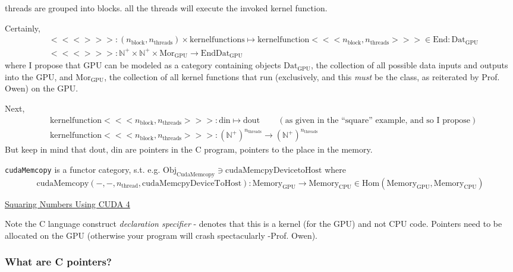 \documentclass[10pt]{amsart}
\begin{document}
\begin{multicols*}{2}
threads are grouped into blocks.  all the threads will execute the invoked kernel function.

Certainly,
\[
\begin{aligned}
  & <<<>>>:(n_{\text{block}}, n_{\text{threads}})\times \text{kernelfunctions} \mapsto \text{kernelfunction}<<<n_{\text{block}},n_{\text{threads}}>>> \in \text{End}:\text{Dat}_{\text{GPU}} \\ 
  & <<<>>>: \mathbb{N}^+ \times \mathbb{N}^+ \times \text{Mor}_{\text{GPU}} \to \text{End}\text{Dat}_{\text{GPU}}
  \end{aligned}
\]
where I propose that GPU can be modeled as a category containing objects $\text{Dat}_{\text{GPU}}$, the collection of all possible data inputs and outputs into the GPU, and $\text{Mor}_{\text{GPU}}$, the collection of all kernel functions that run (exclusively, and this \emph{must} be the class, as reiterated by Prof. Owen) on the GPU.

Next,
\[
\begin{aligned}
  & \text{kernelfunction}<<<n_{\text{block}},n_{\text{threads}}>>>: \text{din}\mapsto \text{dout} \qquad \, (\text{as given in the ``square'' example, and so I propose}) \\ 
  & \text{kernelfunction}<<<n_{\text{block}},n_{\text{threads}}>>>:(\mathbb{N}^+)^{n_{\text{threads}}} \to (\mathbb{N}^+)^{n_{\text{threads}}}
  \end{aligned}
\]
But keep in mind that $\text{dout}$, $\text{din}$ are pointers in the C program, pointers to the place in the memory.  

\verb|cudaMemcopy| is a functor category, s.t. e.g. $\text{Obj}_{\text{CudaMemcopy}} \ni \text{cudaMemcpyDevicetoHost}$ where
\[
\text{cudaMemcopy}(-,-,n_{\text{thread}},\text{cudaMemcpyDeviceToHost}): \text{Memory}_{\text{GPU}} \to \text{Memory}_{\text{CPU}} \in \text{Hom}(\text{Memory}_{\text{GPU}}, \text{Memory}_{\text{CPU}})
\]

\href{https://classroom.udacity.com/courses/cs344/lessons/55120467/concepts/670742910923}{Squaring Numbers Using CUDA 4}

Note the C language construct \emph{declaration specifier} - denotes that this is a kernel (for the GPU) and not CPU code.  Pointers need to be allocated on the GPU (otherwise your program will crash spectacularly -Prof. Owen).  

\subsubsection{What are C pointers?}


\end{multicols*}
\end{document}
